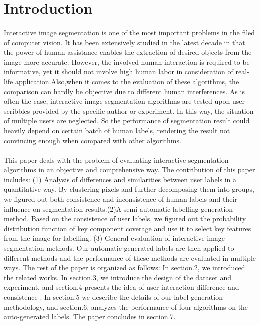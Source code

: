 \documentclass[runningheads,a4paper]{llncs}
\begin{document}
\section{Introduction}

\paragraph{}Interactive image segmentation is one of the most important problems in the filed of computer vision. It has been extensively studied in the latest decade in that the power of human assistance enables the extraction of desired objects from the image more accurate. However, the involved human interaction is required to be informative, yet it should not involve high human labor in consideration of real-life application.Also,when it comes to the evaluation of these algorithms, the comparison can hardly be objective due to different human interferences. As is often the case, interactive image segmentation algorithms are tested upon user scribbles provided by the specific author or experiment. In this way, the situation of multiple users are neglected. So the performance of segmentation result could heavily depend on certain batch of human labels, rendering the result not convincing enough when compared with other algorithms.
\paragraph{}This paper deals with the problem of evaluating interactive segmentation algorithms in an objective and comprehensive way. The contribution of this paper includes: (1)  Analysis of differences and similarities between user labels in a quantitative way. By clustering pixels and further decomposing them into groups, we figured out both consistence and inconsistence of human labels and their influence on segmentation results.(2)A semi-automatic labelling generation method. Based on the consistence of user labels, we figured out the probability distribution function of key component coverage and use it to select key features from the image for labelling. (3) General evaluation of interactive image segmentation methods. Our automatic generated labels are then applied to different methods and the performance of these methods are evaluated in multiple ways.
The rest of the paper is organized as follows: In section.2, we introduced the related works. In section.3, we introduce the design of the dataset and experiment, and section.4 presents the idea of user interaction difference and consistence . In section.5 we describe the details of our label generation methodology, and section.6. analyzes the performance of four algorithms on the auto-generated labels. The paper concludes in section.7.
\end{document}
